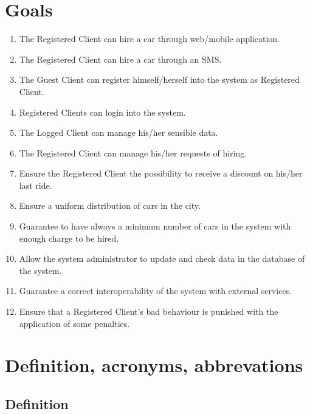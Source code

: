 \section{Goals}
\begin{enumerate}[label=G\arabic*]
\item The Registered Client can hire a car through web/mobile application.
\item The Registered Client can hire a car through an SMS.
\item The Guest Client can register himself/herself into the system as Registered Client.
\item Registered Clients can login into the system.
\item The Logged Client can manage his/her sensible data.
\item The Registered Client can manage his/her requests of hiring.
\item Ensure the Registered Client the possibility to receive a discount on his/her last ride.
\item Ensure a uniform distribution of cars in the city.
\item Guarantee to have always a minimum number of cars in the system with enough charge to be hired.
\item Allow the system administrator to update and check data in the database of the system.
\item Guarantee a correct interoperability of the system with external services.
\item Ensure that a Registered Client’s bad behaviour is punished with the application of some penalties.
\end{enumerate}

\section{Definition, acronyms, abbrevations}

\subsection{Definition}


